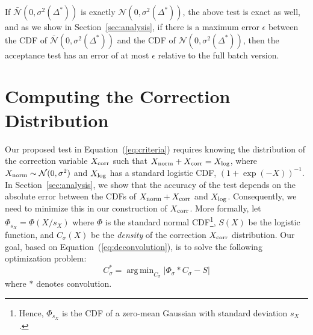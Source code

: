 \documentclass[twoside]{article} \usepackage{aistats2017}
\DeclareMathOperator*{\argmin}{arg\,min}
\begin{document}
If $\mathcal{\bar{N}}(0, \sigma^2(\Delta^*))$ is exactly $\mathcal{N}(0,
\sigma^2(\Delta^*))$, the above test is exact as well, and as we show in
Section~\ref{sec:analysis}, if there is a maximum error $\epsilon$ between the
CDF of $\mathcal{\bar{N}}(0, \sigma^2(\Delta^*))$ and the CDF of $\mathcal{N}(0,
\sigma^2(\Delta^*))$, then the acceptance test has an error of at most
$\epsilon$ relative to the full batch version.




\section{Computing the Correction Distribution}\label{sec:correction}

Our proposed test in Equation~(\ref{eq:criteria}) requires knowing the
distribution of the correction variable $X_{\rm corr}$ such that $X_{\rm norm} +
X_{\rm corr} = X_{\rm log}$, where $X_{\rm norm} \sim \mathcal{N}(0,\sigma^2)$
and $X_{\rm log}$ has a standard logistic CDF, $(1+\exp(-X))^{-1}$. In
Section~\ref{sec:analysis}, we show that the accuracy of the test depends on the
absolute error between the CDFs of $X_{\rm norm} + X_{\rm corr}$ and $X_{\rm
log}$. Consequently, we need to minimize this in our construction of $X_{\rm
corr}$. More formally, let $\Phi_{s_X} = \Phi(X/s_X)$ where $\Phi$ is the
standard normal CDF\footnote{Hence, $\Phi_{s_X}$ is the CDF of a zero-mean
Gaussian with standard deviation $s_X$.}, $S(X)$ be the logistic function, and
$C_{\sigma}(X)$ be the \emph{density} of the correction $X_{\rm corr}$
distribution. Our goal, based on Equation~(\ref{eq:deconvolution}), is to solve
the following optimization problem:
\begin{equation}\label{eq:overall_corr_problem}
    C_\sigma^* = \argmin_{C_\sigma} |\Phi_{\sigma} * C_{\sigma} - S|
\end{equation}
where $*$ denotes convolution.
\end{document}
